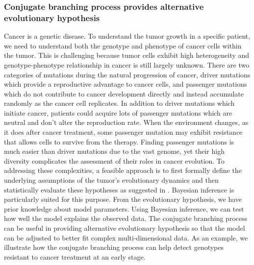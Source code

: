 \documentclass[11pt]{article}
\theoremstyle{plain}
\theoremstyle{definition}
\numberwithin{equation}{section}
\begin{document}
\subsubsection*{Conjugate branching process provides alternative evolutionary hypothesis}
Cancer is a genetic disease. To understand the tumor growth in a specific patient, we need to understand both the genotype and phenotype of cancer cells within the tumor. This is challenging because tumor cells exhibit high heterogeneity and genotype-phenotype relationship in cancer is still largely unknown.
There are two categories of mutations during the natural progression of cancer, driver mutations which provide a reproductive advantage to cancer cells, and passenger mutations which do not contribute to cancer development directly and instead accumulate randomly as the cancer cell replicates. 
In addition to driver mutations which initiate cancer, patients could acquire lots of passenger mutations which are neutral and don't alter the reproduction rate. 
When the environment changes, as it does after cancer treatment, some passenger mutation may exhibit resistance that allows cells to survive from the therapy. 
Finding passenger mutations is much easier than driver mutations due to the vast genome, yet their high diversity complicates the assessment of their roles in cancer evolution. 
To addressing these complexities, a feasible approach is to first formally define the underlying assumptions of the tumor’s evolutionary dynamics and then statistically evaluate these hypotheses as suggested in \cite[Section 4]{Sottoriva2017}. 
Bayesian inference is particularly suited for this purpose. 
From the evolutionary hypothesis, we have prior knowledge about model parameters. Using Bayesian inference, we can test how well the model explains the observed data.
The conjugate branching process can be useful in providing alternative evolutionary hypothesis so that the model can be adjusted to better fit complex multi-dimensional data. 
As an example, we illustrate how the conjugate branching process can help detect genotypes resistant to cancer treatment at an early stage.
 
\end{document}
